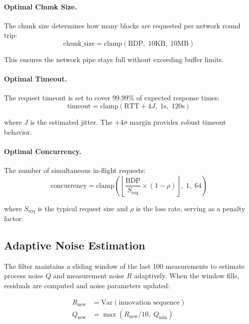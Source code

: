 \documentclass[11pt,a4paper]{article}
\begin{document}
\paragraph{Optimal Chunk Size.} The chunk size determines how many blocks are requested per network round trip:
\begin{equation}
\text{chunk\_size} = \text{clamp}\!\left(\text{BDP},\; 10\text{KB},\; 10\text{MB}\right)
\label{eq:chunk}
\end{equation}

This ensures the network pipe stays full without exceeding buffer limits.

\paragraph{Optimal Timeout.} The request timeout is set to cover 99.99\% of expected response times:
\begin{equation}
\text{timeout} = \text{clamp}\!\left(\text{RTT} + 4J,\; 1\text{s},\; 120\text{s}\right)
\label{eq:timeout}
\end{equation}

where $J$ is the estimated jitter. The $+4\sigma$ margin provides robust timeout behavior.

\paragraph{Optimal Concurrency.} The number of simultaneous in-flight requests:
\begin{equation}
\text{concurrency} = \text{clamp}\!\left(\left\lfloor\frac{\text{BDP}}{S_{\text{req}}} \times (1 - \rho)\right\rfloor,\; 1,\; 64\right)
\label{eq:concurrency}
\end{equation}

where $S_{\text{req}}$ is the typical request size and $\rho$ is the loss rate, serving as a penalty factor.

\subsection{Adaptive Noise Estimation}

The filter maintains a sliding window of the last 100 measurements to estimate process noise $Q$ and measurement noise $R$ adaptively. When the window fills, residuals are computed and noise parameters updated:

\begin{align}
R_{\text{new}} &= \text{Var}(\text{innovation sequence}) \\
Q_{\text{new}} &= \max\!\left(R_{\text{new}} / 10,\; Q_{\min}\right)
\end{align}
\end{document}
